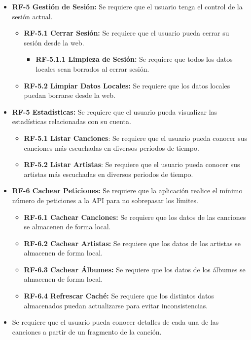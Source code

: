 \begin{itemize}
    \item
        \textbf{RF-5 Gestión de Sesión:} Se requiere que el usuario tenga el control de la sesión actual.
        \begin{itemize}
            \item
                \textbf{RF-5.1 Cerrar Sesión:} Se requiere que el usuario pueda cerrar su sesión desde la web.
                \begin{itemize}
                    \item
                    \textbf{RF-5.1.1 Limpieza de Sesión:} Se requiere que todos los datos locales sean borrados al cerrar sesión.
                \end{itemize}
            \item
                \textbf{RF-5.2 Limpiar Datos Locales:} Se requiere que los datos locales puedan borrarse desde la web.
        \end{itemize}
    
    \item
        \textbf{RF-5 Estadísticas:} Se requiere que el usuario pueda visualizar las estadísticas relacionadas con su cuenta.
        \begin{itemize}
            \item \textbf{RF-5.1 Listar Canciones}: Se requiere que el usuario pueda conocer sus canciones más escuchadas en diversos periodos de tiempo.
            \item \textbf{RF-5.2 Listar Artistas}: Se requiere que el usuario pueda conocer sus artistas más escuchadas en diversos periodos de tiempo.
        \end{itemize}
    
    \item
        \textbf{RF-6 Cachear Peticiones:} Se requiere que la aplicación realice el mínimo número de peticiones a la API para no sobrepasar los límites.
            \begin{itemize}
                \item \textbf{RF-6.1 Cachear Canciones:} Se requiere que los datos de las canciones se almacenen de forma local.
                \item \textbf{RF-6.2 Cachear Artistas:} Se requiere que los datos de los artistas se almacenen de forma local.
                \item \textbf{RF-6.3 Cachear Álbumes:} Se requiere que los datos de los álbumes se almacenen de forma local.
                \item \textbf{RF-6.4 Refrescar Caché:} Se requiere que los distintos datos almacenados puedan actualizarse para evitar inconsistencias.
            \end{itemize}
    \item
         Se requiere que el usuario pueda conocer detalles de cada una de las canciones a partir de un fragmento de la canción.
    
    
\end{itemize}

